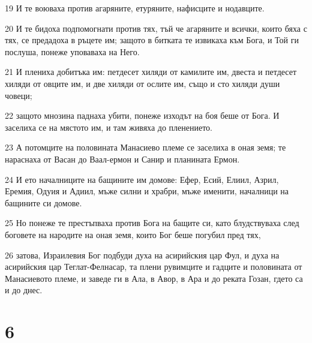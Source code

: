 \par 19 И те воюваха против агаряните, етуряните, нафисците и нодавците.
\par 20 И те бидоха подпомогнати против тях, тъй че агаряните и всички, които бяха с тях, се предадоха в ръцете им; защото в битката те извикаха към Бога, и Той ги послуша, понеже уповаваха на Него.
\par 21 И плениха добитъка им: петдесет хиляди от камилите им, двеста и петдесет хиляди от овците им, и две хиляди от ослите им, също и сто хиляди души човеци;
\par 22 защото мнозина паднаха убити, понеже изходът на боя беше от Бога. И заселиха се на мястото им, и там живяха до пленението.
\par 23 А потомците на половината Манасиево племе се заселиха в оная земя; те нараснаха от Васан до Ваал-ермон и Санир и планината Ермон.
\par 24 И ето началниците на бащините им домове: Ефер, Есий, Елиил, Азрил, Еремия, Одуия и Адиил, мъже силни и храбри, мъже именити, началници на бащините си домове.
\par 25 Но понеже те престъпваха против Бога на бащите си, като блудствуваха след боговете на народите на оная земя, които Бог беше погубил пред тях,
\par 26 затова, Израилевия Бог подбуди духа на асирийския цар Фул, и духа на асирийския цар Теглат-Фелнасар, та плени рувимците и гадците и половината от Манасиевото племе, и заведе ги в Ала, в Авор, в Ара и до реката Гозан, гдето са и до днес.

\chapter{6}

